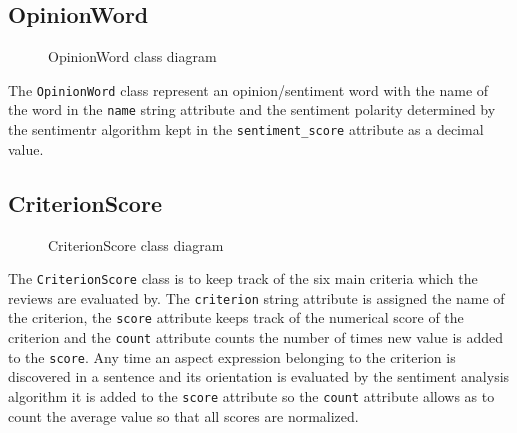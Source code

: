 \newpage
\subsection{OpinionWord}
\begin{figure}[H]
\centering
{}
\caption{OpinionWord class diagram}
\label{img:opinionword}
\end{figure}

The \texttt{OpinionWord} class represent an opinion/sentiment word with the name of the word in the \texttt{name} string attribute and the sentiment polarity determined by the sentimentr algorithm kept in the \texttt{sentiment\_score} attribute as a decimal value.

\subsection{CriterionScore}
\begin{figure}[H]
\centering
{}
\caption{CriterionScore class diagram}
\label{img:criterionscore}
\end{figure}

The \texttt{CriterionScore} class is to keep track of the six main criteria which the reviews are evaluated by. The \texttt{criterion} string attribute is assigned the name of the criterion, the \texttt{score} attribute keeps track of the numerical score of the criterion and the \texttt{count} attribute counts the number of times new value is added to the \texttt{score}. Any time an aspect expression belonging to the criterion is discovered in a sentence and its orientation is evaluated by the sentiment analysis algorithm it is added to the \texttt{score} attribute so the \texttt{count} attribute allows as to count the average value so that all scores are normalized.

